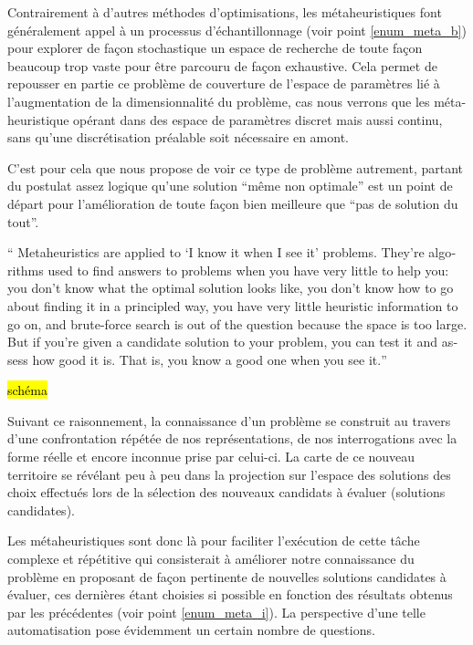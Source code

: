 


Contrairement à d'autres méthodes d'optimisations, les métaheuristiques font généralement appel à un processus d'échantillonnage (voir point \ref{enum_meta_b}) pour explorer de façon stochastique un espace de recherche de toute façon beaucoup trop vaste pour être parcouru de façon exhaustive. Cela permet de repousser en partie ce problème de couverture de l'espace de paramètres lié à l'augmentation de la dimensionnalité du problème, cas nous verrons que les méta-heuristique opérant dans des espace de paramètres discret mais aussi continu, sans qu'une discrétisation préalable soit nécessaire en amont.

C'est pour cela que \textcite[7]{Luke2013} nous propose de voir ce type de problème autrement, partant du postulat assez logique qu'une solution \enquote{même non optimale} est un point de départ pour l'amélioration de toute façon bien meilleure que \enquote{pas de solution du tout}.

\foreignquote{english}{ Metaheuristics are applied to \enquote{I know it when I see it} problems. They're algorithms used to find answers to problems when you have very little to help you: you don't know what the optimal solution looks like, you don't know how to go about finding it in a principled way, you have very little heuristic information to go on, and brute-force search is out of the question because the space is too large. But if you're given a candidate solution to your problem, you can test it and assess how good it is. That is, you know a good one when you see it.}

\hl{schéma}

Suivant ce raisonnement, la connaissance d'un problème se construit au travers d'une confrontation répétée de nos représentations, de nos interrogations avec la forme réelle et encore inconnue prise par celui-ci. La carte de ce nouveau territoire se révélant peu à peu dans la projection sur l'espace des solutions des choix effectués lors de la sélection des nouveaux candidats à évaluer (solutions candidates).

Les métaheuristiques sont donc là pour faciliter l'exécution de cette tâche complexe et répétitive qui consisterait à améliorer notre connaissance du problème en proposant de façon pertinente de nouvelles solutions candidates à évaluer, ces dernières étant choisies si possible en fonction des résultats obtenus par les précédentes (voir point \ref{enum_meta_i}). La perspective d'une telle automatisation pose évidemment un certain nombre de questions.


